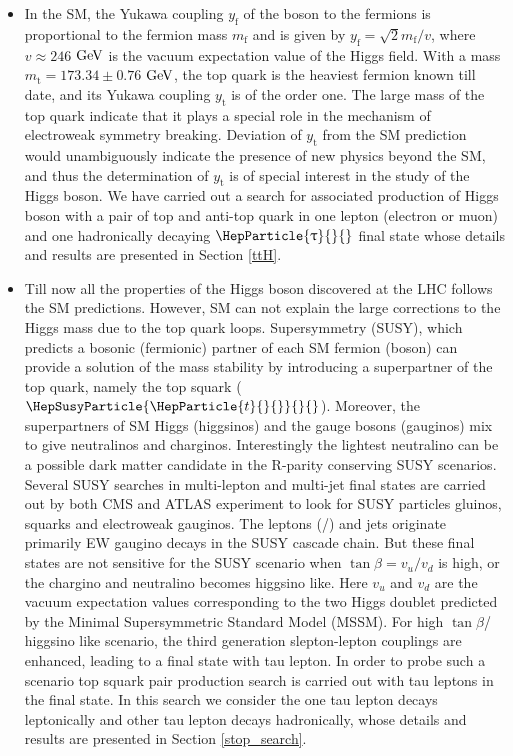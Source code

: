 \documentclass[12pt, a4paper]{article}
\newcommand{\mf}{\ensuremath{m_{\mathrm{f}}}}
\newcommand{\yt}{\ensuremath{y_{\mathrm{t}}}}
\newcommand{\yf}{\ensuremath{y_{\mathrm{f}}}}
\newcommand{\GeV}{\ensuremath{\text{Ge\hspace{-.08em}V}}{}\xspace}
\DeclareRobustCommand{\PH}{{\HepParticle{H}{}{}}\xspace}
\DeclareRobustCommand{\PQt}{\HepParticle{t}{}{}} %
\DeclareRobustCommand{\Pe}{{\HepParticle{e}{}{}}\xspace} %
\DeclareRobustCommand{\PGm}{{\HepParticle{\upmu}{}{}}\xspace} %
\DeclareRobustCommand{\PGt}{{\HepParticle{\uptau}{}{}}\xspace} %
\DeclareRobustCommand{\PSQt}{{\HepSusyParticle{\PQt}{}{}}\xspace} %
\begin{document}
\begin{itemize} 
\item In the SM, the Yukawa coupling $\yf$ of the \PH boson to the fermions is proportional to the fermion mass $\mf$  and is given by $\yf=\sqrt{2}\mf/v$, where $v\approx 246$ \GeV is the vacuum expectation value of the Higgs field. With a mass $m_{\text{t}}=173.34\pm 0.76$ \GeV\cite{ATLAS:2014wva}, the top quark is the heaviest fermion known till date, and its Yukawa coupling $\yt$ is of the order one. The large mass of the top quark indicate that it plays a special role in the mechanism of electroweak symmetry breaking\cite{Dobrescu:1997nm,Chivukula:1998wd,Delepine:1995qs}. Deviation of $\yt$ from the SM prediction would unambiguously indicate the presence of new physics beyond the SM, and thus the determination of $\yt$ is of special interest in the study of the Higgs boson. We have carried out a search for associated production of Higgs boson with a pair of top and anti-top quark in one lepton (electron or muon) and one hadronically decaying $\PGt$ final state whose details and results are presented in Section \ref{ttH}.

\item Till now all the properties of the Higgs boson discovered at the LHC follows the SM predictions. However, SM can not explain the large corrections to the Higgs mass due to the top quark loops. Supersymmetry (SUSY), which predicts a bosonic (fermionic) partner of each SM fermion (boson) can provide a solution of the \PH mass stability by introducing a superpartner of the top quark, namely the top squark ($\PSQt$). Moreover, the superpartners of SM Higgs (higgsinos) and the gauge bosons (gauginos) mix to give neutralinos and charginos. Interestingly the lightest neutralino can be a possible dark matter candidate in the R-parity conserving SUSY scenarios\cite{FARRAR1978575}. %
Several SUSY searches in multi-lepton and multi-jet final states are carried out by both CMS and ATLAS experiment to look for SUSY particles gluinos, squarks and electroweak gauginos. The leptons (\Pe/\PGm) and jets originate primarily EW gaugino decays in the SUSY cascade chain. But these final states are not sensitive for the SUSY scenario when $\tan\beta=v_{u}/v_{d}$ is high, or the chargino and neutralino becomes higgsino like. Here $v_{u}$ and $v_{d}$ are the vacuum expectation values corresponding to the two Higgs doublet predicted by the Minimal Supersymmetric Standard Model (MSSM). For high $\tan\beta$/ higgsino like scenario, the third generation slepton-lepton couplings are enhanced, leading to a final state with tau lepton. In order to probe such a scenario top squark pair production search is carried out with tau leptons in the final state. In this search we consider the one tau lepton decays leptonically and other tau lepton decays hadronically, whose details and results are presented in Section \ref{stop_search}.
\end{itemize}
\end{document}
